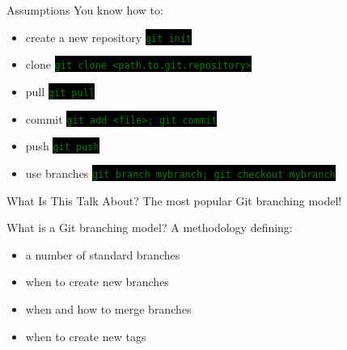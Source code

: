 \documentclass[
14pt,
aspectratio=169,
usenames,
dvipsnames,
x11names]{beamer}
\newcommand{\code}[1]{{\small\setlength{\fboxsep}{2pt}\colorbox{black}{\textcolor{green}{\texttt{#1}}}}}
\begin{document}
\begin{frame}{Assumptions}
  \alert{You} know how to:
  \begin{itemize}
  \item create a new repository \hfill \code{git init}
  \item clone \hfill \code{git clone <path.to.git.repository>}
  \item pull \hfill \code{git pull}
  \item commit \hfill \code{git add <file>; git commit}
  \item push \hfill \code{git push}
  \item use branches \hfill \code{git branch mybranch; git checkout mybranch}
  \end{itemize}
\end{frame}

\begin{frame}{What Is This Talk About?}
  \centering
  The \alert{most popular} Git branching model!
\end{frame}

\begin{frame}{What is a Git branching model?}
  A \alert{methodology} defining:\\[1ex]
  \begin{itemize} \setlength{\itemsep}{\fill}
  \item a number of standard branches
  \item when to create new branches
  \item when and how to merge branches
  \item when to create new tags
  \end{itemize}
\end{frame}
\end{document}
